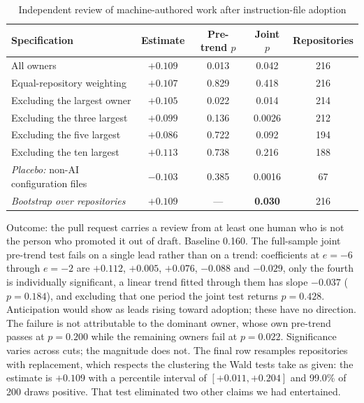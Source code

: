 \documentclass[mnsc]{informs4}
\begin{document}
\begin{table}[t]
\caption{Independent review of machine-authored work after instruction-file adoption}
\label{tab:independent}
\centering\small
\begin{tabular}{lcccc}
\toprule
Specification & Estimate & Pre-trend $p$ & Joint $p$ & Repositories \\
\midrule
All owners & $+0.109$ & 0.013 & 0.042 & 216 \\
Equal-repository weighting & $+0.107$ & 0.829 & 0.418 & 216 \\
Excluding the largest owner & $+0.105$ & 0.022 & 0.014 & 214 \\
Excluding the three largest & $+0.099$ & 0.136 & 0.0026 & 212 \\
Excluding the five largest & $+0.086$ & 0.722 & 0.092 & 194 \\
Excluding the ten largest & $+0.113$ & 0.738 & 0.216 & 188 \\[3pt]
\emph{Placebo:} non-AI configuration files & $-0.103$ & 0.385 & 0.0016 & 67 \\[3pt]
\emph{Bootstrap over repositories} & $+0.109$ & --- & \textbf{0.030} & 216 \\
\bottomrule
\end{tabular}
\par\vspace{2pt}
\footnotesize Outcome: the pull request carries a review from at least one human
who is not the person who promoted it out of draft. Baseline 0.160. The
full-sample joint pre-trend test fails on a single lead rather than on a trend:
coefficients at $e=-6$ through $e=-2$ are $+0.112$, $+0.005$, $+0.076$, $-0.088$
and $-0.029$, only the fourth is individually significant, a linear trend fitted
through them has slope $-0.037$ ($p=0.184$), and excluding that one period the
joint test returns $p=0.428$. Anticipation would show as leads rising toward
adoption; these have no direction. The failure is not attributable to the
dominant owner, whose own pre-trend passes at $p=0.200$ while the remaining
owners fail at $p=0.022$. Significance varies across
cuts; the magnitude does not. The final row resamples repositories with
replacement, which respects the clustering the Wald tests take as given: the
estimate is $+0.109$ with a percentile interval of $[+0.011, +0.204]$ and 99.0\%
of 200 draws positive. That test eliminated two other claims we had entertained.
\end{table}
\end{document}

